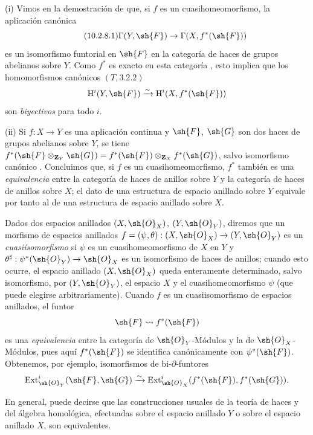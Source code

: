 \begin{remarks}[10.2.8]
\label{IV.10.2.8}
(i) Vimos en la demostración de  que, si $f$ es un cuasihomeomorfismo, la aplicación canónica
\begin{equation}
\label{IV.10.2.8.1}
\tag{10.2.8.1}
\Gamma(Y,\sh{F})\to\Gamma(X,f^*(\sh{F}))
\end{equation}
es un isomorfismo funtorial en $\sh{F}$ en la categoría de haces de grupos abelianos sobre $Y$.
Como $f^*$ es exacto en esta categoría , esto implica que los homomorfismos canónicos $(T,3.2.2)$
\[
  \mathrm{H}^i(Y,\sh{F})\xrightarrow{\sim}\mathrm{H}^i(X,f^*(\sh{F}))
\]
son \emph{biyectivos} para todo $i$.

(ii) Si $f:X\to Y$ es una aplicación continua y $\sh{F}$, $\sh{G}$ son dos haces de grupos abelianos sobre $Y$, se tiene $f^*(\sh{F}\otimes_{\mathbf{Z}_Y}\sh{G})=f^*(\sh{F})\otimes_{\mathbf{Z}_X}f^*(\sh{G})$, salvo isomorfismo canónico .
Concluimos que, si $f$ es un cuasihomeomorfismo, $f^*$ también es una \emph{equivalencia} entre la categoría de haces de anillos sobre $Y$ y la categoría de haces de anillos sobre $X$; el dato de una estructura de espacio anillado sobre $Y$ equivale por tanto al de una estructura de espacio anillado sobre $X$.

Dados dos espacios anillados $(X,\sh{O}_X)$, $(Y,\sh{O}_Y)$, diremos que un morfismo de espacios anillados $f=(\psi,\theta):(X,\sh{O}_X)\to(Y,\sh{O}_Y)$ es un \emph{cuasiisomorfismo} si $\psi$ es un cuasihomeomorfismo de $X$ en $Y$ y $\theta^\sharp:\psi^*(\sh{O}_Y)\to\sh{O}_X$ es un isomorfismo de haces de anillos; cuando esto ocurre, el espacio anillado $(X,\sh{O}_X)$ queda enteramente determinado, salvo isomorfismo, por $(Y,\sh{O}_Y)$, el espacio $X$ y el cuasihomeomorfismo $\psi$ (que puede elegirse arbitrariamente).
Cuando $f$ es un cuasiisomorfismo de espacios anillados, el funtor
\[
  \sh{F}\leadsto f^*(\sh{F})
\]
es una \emph{equivalencia} entre la categoría de $\sh{O}_Y$-Módulos y la de $\sh{O}_X$-Módulos, pues aquí $f^*(\sh{F})$ se identifica canónicamente con $\psi^*(\sh{F})$.
Obtenemos, por ejemplo, isomorfismos de bi-$\partial$-funtores
\[
  \operatorname{Ext}^i_{\sh{O}_Y}(\sh{F},\sh{G})\xrightarrow{\sim}\operatorname{Ext}^i_{\sh{O}_X}(f^*(\sh{F}),f^*(\sh{G})).
\]

En general, puede decirse que las construcciones usuales de la teoría de haces y del álgebra homológica, efectuadas sobre el espacio anillado $Y$ o sobre el espacio anillado $X$, son equivalentes.
\end{remarks}

